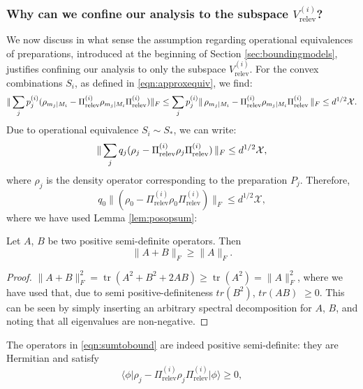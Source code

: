 \subsubsection{Why can we confine our analysis to the subspace $V_{\text{relev}}^{(i)}$?}
We now discuss in what sense the assumption regarding operational equivalences of preparations, introduced at the beginning of Section \ref{sec:boundingmodels}, justifies confining our analysis to only the subspace $V_{\text{relev}}^{(i)}$. 
For the convex combinations $S_i$, as defined in \ref{eqn:approxequiv}, we find:
\begin{equation*}
\|\sum_j p_j^{(i)}(\rho_{m_j\vert M_i}-\Pi_{\text{relev}}^{(i)}\rho_{m_j\vert M_i}\Pi_{\text{relev}}^{(i)})\|_F \leq \sum_j p_j^{(i)}\|\thinspace\rho_{m_j\vert M_i}-\Pi_{\text{relev}}^{(i)}\rho_{m_j\vert M_i}\Pi_{\text{relev}}^{(i)}\thinspace\|_F \leq d^{1/2}\mathcal{X}.
\end{equation*}
Due to operational equivalence $S_i\sim S_{*}$, we can write:
\begin{equation*}
\|\sum_j q_j(\rho_{j}-\Pi_{\text{relev}}^{(i)}\rho_{j}\Pi_{\text{relev}}^{(i)})\thinspace\|_F \leq d^{1/2}\mathcal{X},
\end{equation*}
where $\rho_{j}$ is the density operator corresponding to the preparation $P_j$.
Therefore,
\begin{equation}
\label{eqn:sumtobound}
q_0\|(\rho_{0}-\Pi_{\text{relev}}^{(i)}\rho_{0}\Pi_{\text{relev}}^{(i)})\|_F \leq d^{1/2}\mathcal{X},
\end{equation}
where we have used Lemma \ref{lem:posopsum}:
\begin{lemma}
\label{lem:posopsum}
Let $A$, $B$ be two positive semi-definite operators. Then
\begin{equation*}
\|A+B\|_F \geq \|A\|_F.
\end{equation*}
\end{lemma}
\begin{proof}
$\|A+B\|_F^2=\operatorname{tr}(A^2+B^2+2AB)\geq \operatorname{tr}(A^2)=\|A\|_F^2$, where we have used that, due to semi positive-definiteness $tr(B^2)$, $tr(AB)$ $\geq 0$. This can be seen by simply inserting an arbitrary spectral decomposition for $A$, $B$, and noting that all eigenvalues are non-negative.
\end{proof}
The operators in \ref{eqn:sumtobound} are indeed positive semi-definite: they are Hermitian and satisfy
\begin{equation*}
\langle \phi \vert \rho_{j}-\Pi_{\text{relev}}^{(i)}\rho_{j}\Pi_{\text{relev}}^{(i)} \vert \phi \rangle \geq 0,
\end{equation*}

